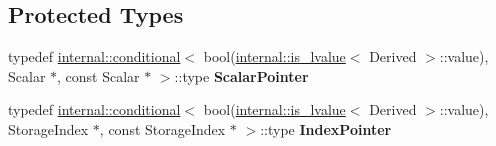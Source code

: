 \subsection*{Protected Types}
\begin{DoxyCompactItemize}
\item 
\mbox{\label{class_eigen_1_1_sparse_map_base_3_01_derived_00_01_read_only_accessors_01_4_ae82da94647413ae2660745473f5de5ad}} 
typedef \mbox{\hyperlink{struct_eigen_1_1internal_1_1conditional}{internal\+::conditional}}$<$ bool(\mbox{\hyperlink{struct_eigen_1_1internal_1_1is__lvalue}{internal\+::is\+\_\+lvalue}}$<$ Derived $>$\+::value), Scalar $\ast$, const Scalar $\ast$ $>$\+::type {\bfseries Scalar\+Pointer}
\item 
\mbox{\label{class_eigen_1_1_sparse_map_base_3_01_derived_00_01_read_only_accessors_01_4_af892ea4d6c3b19212cae89fe1f117793}} 
typedef \mbox{\hyperlink{struct_eigen_1_1internal_1_1conditional}{internal\+::conditional}}$<$ bool(\mbox{\hyperlink{struct_eigen_1_1internal_1_1is__lvalue}{internal\+::is\+\_\+lvalue}}$<$ Derived $>$\+::value), Storage\+Index $\ast$, const Storage\+Index $\ast$ $>$\+::type {\bfseries Index\+Pointer}
\end{DoxyCompactItemize}
